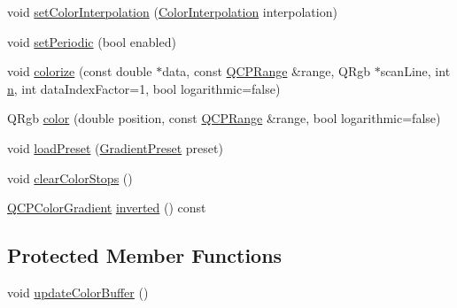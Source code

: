 \begin{DoxyCompactItemize}
void \hyperlink{class_q_c_p_color_gradient_aa13fda86406e1d896a465a409ae63b38}{set\+Color\+Interpolation} (\hyperlink{class_q_c_p_color_gradient_ac5dca17cc24336e6ca176610e7f77fc1}{Color\+Interpolation} interpolation)
\item 
void \hyperlink{class_q_c_p_color_gradient_a39d6448155fc00a219f239220d14bb39}{set\+Periodic} (bool enabled)
\item 
void \hyperlink{class_q_c_p_color_gradient_aaf423ceb943e177b0ed2c48c811d83dc}{colorize} (const double $\ast$data, const \hyperlink{class_q_c_p_range}{Q\+C\+P\+Range} \&range, Q\+Rgb $\ast$scan\+Line, int \hyperlink{_v_s_a___u_t_2_comparision_pictures_2_createtest_image_8m_aeab71244afb687f16d8c4f5ee9d6ef0e}{n}, int data\+Index\+Factor=1, bool logarithmic=false)
\item 
Q\+Rgb \hyperlink{class_q_c_p_color_gradient_a0599545c859268b025d2060dea741cea}{color} (double position, const \hyperlink{class_q_c_p_range}{Q\+C\+P\+Range} \&range, bool logarithmic=false)
\item 
void \hyperlink{class_q_c_p_color_gradient_aa0aeec1528241728b9671bf8e60b1622}{load\+Preset} (\hyperlink{class_q_c_p_color_gradient_aed6569828fee337023670272910c9072}{Gradient\+Preset} preset)
\item 
void \hyperlink{class_q_c_p_color_gradient_a939213e85f0d1279519d555c5fcfb6ad}{clear\+Color\+Stops} ()
\item 
\hyperlink{class_q_c_p_color_gradient}{Q\+C\+P\+Color\+Gradient} \hyperlink{class_q_c_p_color_gradient_abe04e1d1ccab3d7aa78f2924faed4916}{inverted} () const 
\end{DoxyCompactItemize}
\subsection*{Protected Member Functions}
\begin{DoxyCompactItemize}
\item 
void \hyperlink{class_q_c_p_color_gradient_a353f15ab3ab586eebf1f6b58c3e2707b}{update\+Color\+Buffer} ()
\end{DoxyCompactItemize}

